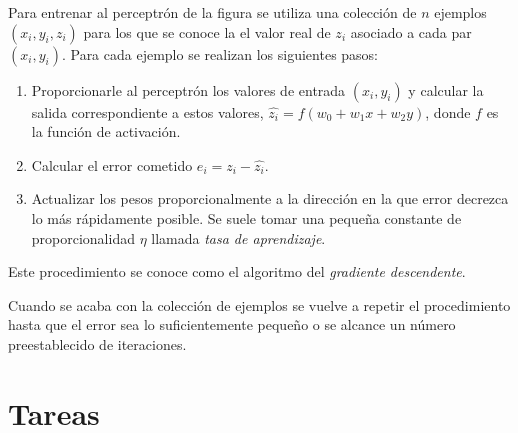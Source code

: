\documentclass[
  a4paper,
]{scrreport}
\providecommand{\tightlist}{%
  \setlength{\itemsep}{0pt}\setlength{\parskip}{0pt}}\usepackage{longtable,booktabs,array}
\begin{document}
Para entrenar al perceptrón de la figura se utiliza una colección de
\(n\) ejemplos \((x_i,y_i,z_i)\) para los que se conoce la el valor real
de \(z_i\) asociado a cada par \((x_i,y_i)\). Para cada ejemplo se
realizan los siguientes pasos:

\begin{enumerate}
\def\labelenumi{\arabic{enumi}.}
\tightlist
\item
  Proporcionarle al perceptrón los valores de entrada \((x_i,y_i)\) y
  calcular la salida correspondiente a estos valores,
  \(\hat{z_i} = f(w_0+w_1x+w_2y)\), donde \(f\) es la función de
  activación.
\item
  Calcular el error cometido \(e_i = z_i-\hat{z_i}\).
\item
  Actualizar los pesos proporcionalmente a la dirección en la que error
  decrezca lo más rápidamente posible. Se suele tomar una pequeña
  constante de proporcionalidad \(\eta\) llamada \emph{tasa de
  aprendizaje}.
\end{enumerate}

Este procedimiento se conoce como el algoritmo del \emph{gradiente
descendente}.

Cuando se acaba con la colección de ejemplos se vuelve a repetir el
procedimiento hasta que el error sea lo suficientemente pequeño o se
alcance un número preestablecido de iteraciones.

\section{Tareas}\label{tareas-6}
\end{document}
